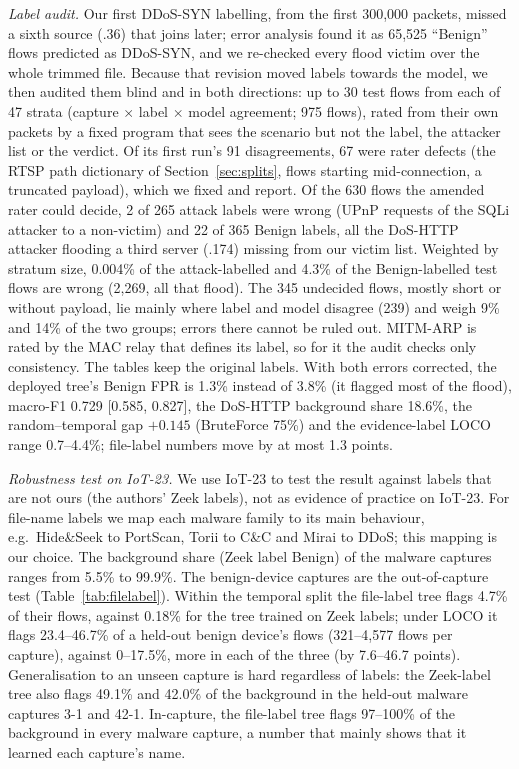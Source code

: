 \emph{Label audit.} Our first DDoS-SYN labelling, from the first 300,000 packets, missed a sixth source (.36) that joins later; error analysis found it as 65,525 ``Benign'' flows predicted as DDoS-SYN, and we re-checked every flood victim over the whole trimmed file. Because that revision moved labels towards the model, we then audited them blind and in both directions: up to 30 test flows from each of 47 strata (capture $\times$ label $\times$ model agreement; 975 flows), rated from their own packets by a fixed program that sees the scenario but not the label, the attacker list or the verdict. Of its first run's 91 disagreements, 67 were rater defects (the RTSP path dictionary of Section~\ref{sec:splits}, flows starting mid-connection, a truncated payload), which we fixed and report. Of the 630 flows the amended rater could decide, 2 of 265 attack labels were wrong (UPnP requests of the SQLi attacker to a non-victim) and 22 of 365 Benign labels, all the DoS-HTTP attacker flooding a third server (.174) missing from our victim list. Weighted by stratum size, 0.004\% of the attack-labelled and 4.3\% of the Benign-labelled test flows are wrong (2,269, all that flood). The 345 undecided flows, mostly short or without payload, lie mainly where label and model disagree (239) and weigh 9\% and 14\% of the two groups; errors there cannot be ruled out. MITM-ARP is rated by the MAC relay that defines its label, so for it the audit checks only consistency. The tables keep the original labels. With both errors corrected, the deployed tree's Benign FPR is 1.3\% instead of 3.8\% (it flagged most of the flood), macro-F1 0.729 [0.585, 0.827], the DoS-HTTP background share 18.6\%, the random--temporal gap $+0.145$ (BruteForce 75\%) and the evidence-label LOCO range 0.7--4.4\%; file-label numbers move by at most 1.3 points.

\emph{Robustness test on IoT-23.} We use IoT-23 to test the result against labels that are not ours (the authors' Zeek labels), not as evidence of practice on IoT-23. For file-name labels we map each malware family to its main behaviour, e.g.\ Hide\&Seek to PortScan, Torii to C\&C and Mirai to DDoS; this mapping is our choice. The background share (Zeek label Benign) of the malware captures ranges from 5.5\% to 99.9\%. The benign-device captures are the out-of-capture test (Table~\ref{tab:filelabel}). Within the temporal split the file-label tree flags 4.7\% of their flows, against 0.18\% for the tree trained on Zeek labels; under LOCO it flags 23.4--46.7\% of a held-out benign device's flows (321--4,577 flows per capture), against 0--17.5\%, more in each of the three (by 7.6--46.7 points). Generalisation to an unseen capture is hard regardless of labels: the Zeek-label tree also flags 49.1\% and 42.0\% of the background in the held-out malware captures 3-1 and 42-1. In-capture, the file-label tree flags 97--100\% of the background in every malware capture, a number that mainly shows that it learned each capture's name.

